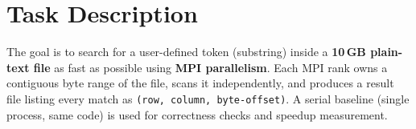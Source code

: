 \documentclass[11pt,a4paper]{article}
\begin{document}
\section{Task Description}

The goal is to search for a user-defined token (substring) inside a \textbf{10\,GB plain-text file} as fast as possible using \textbf{MPI parallelism}.
Each MPI rank owns a contiguous byte range of the file, scans it independently, and produces a result file listing every match as \texttt{(row, column, byte-offset)}.
A serial baseline (single process, same code) is used for correctness checks and speedup measurement.

\vspace{0.4cm}
\end{document}
